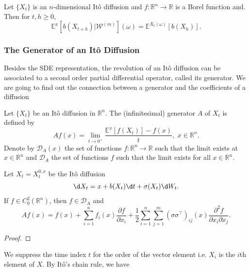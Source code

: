 \begin{theorem}
  Let $\{X_t\}$ is an $n$-dimensional Itô diffusion and $f:\mathbb{R}^n\to\mathbb{R}$ is a Borel function and. Then for $t,h\ge0$,
  \begin{equation}
    \mathbb{E}^x\left[b(X_{t+h})|\mathcal{W}^{(m)}\right](\omega)=\mathbb{E}^{X_t(\omega)}[b(X_h)].
  \end{equation}
\end{theorem}

\subsubsection{The Generator of an Itô Diffusion}
Besides the SDE representation, the revolution of an Itô diffusion can be associated to a second order
partial differential operator, called its generator. We are going to find out the connection between a generator and the coefficients of a diffusion

\begin{definition}
  Let $\{X_t\}$ be an Itô diffusion in $\mathbb{R}^n$. The (infinitesimal) generator $A$ of $X_t$ is defined by
  \begin{equation}
    \label{definition:gen}
    Af(x)=\lim\limits_{t\to0^+}\dfrac{\mathbb{E}^x[f(X_t)]-f(x)}{t},\,\,x\in\mathbb{R}^n.
  \end{equation}
  Denote by $\mathcal{D}_A(x)$ the set of functions $f:\mathbb{R}^n\to\mathbb{R}$ such that the limit exists at $x\in\mathbb{R}^n$ and $\mathcal{D}_A$ the set of functions $f$ such that the limit exists for all $x\in\mathbb{R}^n$.
\end{definition}


\begin{theorem}
  Let $X_t=X^{0,x}_t$ be the Itô diffusion
  $$\d X_t = x+b(X_t)\d t+\sigma(X_t)\d W_t.$$
  If $f\in C^2_0(\mathbb{R}^n)$, then $f\in\mathcal{D}_A$ and
  \begin{equation}
    \label{equation:gen}
    Af(x)=f(x)+\sum\limits_{i=1}^n f_i(x)\dfrac{\partial f}{\partial x_i} + \dfrac{1}{2}\sum\limits_{i=1}^n\sum\limits_{j=1}^m(\sigma \sigma^\top)_{ij}(x)\dfrac{\partial^2f}{\partial x_i\partial x_j}.
  \end{equation}
\end{theorem}

\begin{proof}

\end{proof}

We suppress the time index $t$ for the order of the vector element i.e. $X_i$ is the $i$th element of $X$. By Itô's chain rule, we have

